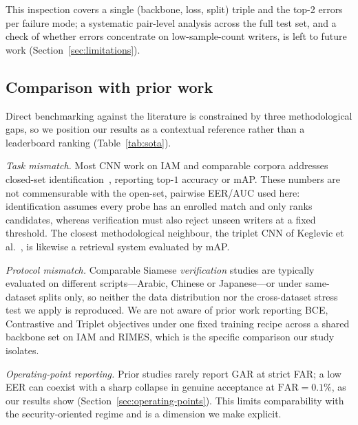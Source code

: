 This inspection covers a single (backbone, loss, split) triple and
the top-2 errors per failure mode; a systematic pair-level analysis
across the full test set, and a check of whether errors concentrate on
low-sample-count writers, is left to future work
(Section~\ref{sec:limitations}).

\subsection{Comparison with prior work}
\label{sec:sota}

Direct benchmarking against the literature is constrained by three
methodological gaps, so we position our results as a contextual reference
rather than a leaderboard ranking (Table~\ref{tab:sota}).

\emph{Task mismatch.} Most CNN work on IAM and comparable corpora addresses
closed-set identification~\cite{fiel2015,christlein2015}, reporting top-$1$
accuracy or mAP. These numbers are not commensurable with the open-set,
pairwise EER/AUC used here: identification assumes every probe has an enrolled
match and only ranks candidates, whereas verification must also reject unseen
writers at a fixed threshold. The closest methodological neighbour, the triplet
CNN of Keglevic et al.~\cite{keglevic2018}, is likewise a retrieval system
evaluated by mAP.

\emph{Protocol mismatch.} Comparable Siamese \emph{verification} studies are
typically evaluated on different scripts—Arabic, Chinese or Japanese—or under
same-dataset splits only, so neither the data distribution nor the
cross-dataset stress test we apply is reproduced. We are not aware of prior
work reporting BCE, Contrastive and Triplet objectives under one fixed training
recipe across a shared backbone set on IAM and RIMES, which is the specific
comparison our study isolates.

\emph{Operating-point reporting.} Prior studies rarely report GAR at strict
FAR; a low EER can coexist with a sharp collapse in genuine acceptance at
$\text{FAR}=0.1\%$, as our results show (Section~\ref{sec:operating-points}). This
limits comparability with the security-oriented regime and is a dimension we
make explicit.



